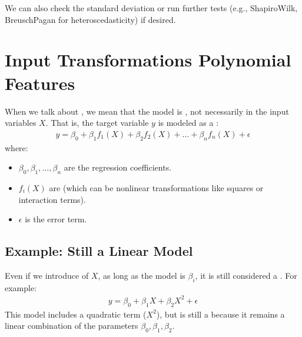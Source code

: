 \documentclass[letterpaper,10pt,english]{jupyterBook}
\begin{document}
\sphinxAtStartPar
We can also check the standard deviation or run further tests (e.g., Shapiro\sphinxhyphen{}Wilk, Breusch\sphinxhyphen{}Pagan for heteroscedasticity) if desired.


\section{Input Transformations \sphinxhyphen{} Polynomial Features}
\label{\detokenize{02:input-transformations-polynomial-features}}
\sphinxAtStartPar
When we talk about , we mean that the model is , not necessarily in the input variables \(X\). That is, the target variable \(y\) is modeled as a :
\begin{equation*}
\begin{split}
y = \beta_0 + \beta_1 f_1(X) + \beta_2 f_2(X) + \dots + \beta_n f_n(X) + \epsilon
\end{split}
\end{equation*}
\sphinxAtStartPar
where:
\begin{itemize}
\item {} 
\sphinxAtStartPar
\( \beta_0, \beta_1, \dots, \beta_n \) are the regression coefficients.

\item {} 
\sphinxAtStartPar
\( f_i(X) \) are  (which can be non\sphinxhyphen{}linear transformations like squares or interaction terms).

\item {} 
\sphinxAtStartPar
\( \epsilon \) is the error term.

\end{itemize}


\subsection{Example: Still a Linear Model}
\label{\detokenize{02:example-still-a-linear-model}}
\sphinxAtStartPar
Even if we introduce  of \(X\), as long as the model is  \( \beta_i \), it is still considered a . For example:
\begin{equation*}
\begin{split}
y = \beta_0 + \beta_1 X + \beta_2 X^2 + \epsilon
\end{split}
\end{equation*}
\sphinxAtStartPar
This model includes a quadratic term (\(X^2\)), but is still a  because it remains a linear combination of the parameters \(\beta_0, \beta_1, \beta_2\).
\end{document}
